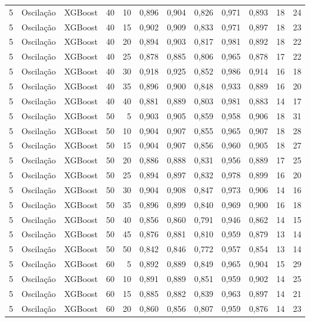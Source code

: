 \begin{longtable}{@{}rllrrrrrrrrr@{}}
5 & Oscilação & XGBoost & 40 & 10 & 0,896 & 0,904 & 0,826 & 0,971 & 0,893 & 18 & 24 \\
5 & Oscilação & XGBoost & 40 & 15 & 0,902 & 0,909 & 0,833 & 0,971 & 0,897 & 18 & 23 \\
5 & Oscilação & XGBoost & 40 & 20 & 0,894 & 0,903 & 0,817 & 0,981 & 0,892 & 18 & 22 \\
5 & Oscilação & XGBoost & 40 & 25 & 0,878 & 0,885 & 0,806 & 0,965 & 0,878 & 17 & 22 \\
5 & Oscilação & XGBoost & 40 & 30 & 0,918 & 0,925 & 0,852 & 0,986 & 0,914 & 16 & 18 \\
5 & Oscilação & XGBoost & 40 & 35 & 0,896 & 0,900 & 0,848 & 0,933 & 0,889 & 16 & 20 \\
5 & Oscilação & XGBoost & 40 & 40 & 0,881 & 0,889 & 0,803 & 0,981 & 0,883 & 14 & 17 \\
5 & Oscilação & XGBoost & 50 & 5 & 0,903 & 0,905 & 0,859 & 0,958 & 0,906 & 18 & 31 \\
5 & Oscilação & XGBoost & 50 & 10 & 0,904 & 0,907 & 0,855 & 0,965 & 0,907 & 18 & 28 \\
5 & Oscilação & XGBoost & 50 & 15 & 0,904 & 0,907 & 0,856 & 0,960 & 0,905 & 18 & 27 \\
5 & Oscilação & XGBoost & 50 & 20 & 0,886 & 0,888 & 0,831 & 0,956 & 0,889 & 17 & 25 \\
5 & Oscilação & XGBoost & 50 & 25 & 0,894 & 0,897 & 0,832 & 0,978 & 0,899 & 16 & 20 \\
5 & Oscilação & XGBoost & 50 & 30 & 0,904 & 0,908 & 0,847 & 0,973 & 0,906 & 14 & 16 \\
5 & Oscilação & XGBoost & 50 & 35 & 0,896 & 0,899 & 0,840 & 0,969 & 0,900 & 16 & 18 \\
5 & Oscilação & XGBoost & 50 & 40 & 0,856 & 0,860 & 0,791 & 0,946 & 0,862 & 14 & 15 \\
5 & Oscilação & XGBoost & 50 & 45 & 0,876 & 0,881 & 0,810 & 0,959 & 0,879 & 13 & 14 \\
5 & Oscilação & XGBoost & 50 & 50 & 0,842 & 0,846 & 0,772 & 0,957 & 0,854 & 13 & 14 \\
5 & Oscilação & XGBoost & 60 & 5 & 0,892 & 0,889 & 0,849 & 0,965 & 0,904 & 15 & 29 \\
5 & Oscilação & XGBoost & 60 & 10 & 0,891 & 0,889 & 0,851 & 0,959 & 0,902 & 14 & 25 \\
5 & Oscilação & XGBoost & 60 & 15 & 0,885 & 0,882 & 0,839 & 0,963 & 0,897 & 14 & 21 \\
5 & Oscilação & XGBoost & 60 & 20 & 0,860 & 0,856 & 0,807 & 0,959 & 0,876 & 14 & 23 \\

\end{longtable}

